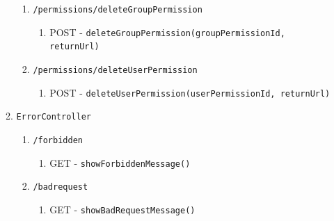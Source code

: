 \documentclass[12pt,DIV14,BCOR10mm,a4paper,parskip=half-,headsepline,headinclude,english,ngerman,bibliography=totocnumbered]{scrreprt}
\begin{document}
\begin{enumerate}
\begin{enumerate}
\begin{enumerate}
      \item \texttt{/permissions/deleteGroupPermission}
      \begin{enumerate}
        \item POST - \texttt{deleteGroupPermission(groupPermissionId, returnUrl)}
      \end{enumerate}
      \item \texttt{/permissions/deleteUserPermission}
      \begin{enumerate}
        \item POST - \texttt{deleteUserPermission(userPermissionId, returnUrl)}
      \end{enumerate}
    \end{enumerate}

    \item \texttt{ErrorController}
    \begin{enumerate}
     \item \texttt{/forbidden}
      \begin{enumerate}
        \item GET - \texttt{showForbiddenMessage()}
      \end{enumerate}
      \item \texttt{/badrequest}
      \begin{enumerate}
        \item GET - \texttt{showBadRequestMessage()}
      \end{enumerate}
    \end{enumerate}


\end{enumerate}
\end{enumerate}
\end{document}
